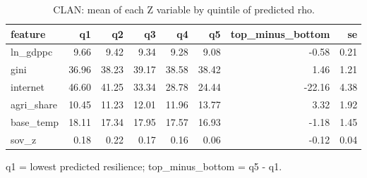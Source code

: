 \begin{table}[htbp]
\centering
\caption{CLAN: mean of each Z variable by quintile of predicted rho.}
\label{tab:agri_clan}
\begin{tabular}{lrrrrrrr}
\toprule
feature & q1 & q2 & q3 & q4 & q5 & top\_minus\_bottom & se \\
\midrule
ln\_gdppc & 9.66 & 9.42 & 9.34 & 9.28 & 9.08 & -0.58 & 0.21 \\
gini & 36.96 & 38.23 & 39.17 & 38.58 & 38.42 & 1.46 & 1.21 \\
internet & 46.60 & 41.25 & 33.34 & 28.78 & 24.44 & -22.16 & 4.38 \\
agri\_share & 10.45 & 11.23 & 12.01 & 11.96 & 13.77 & 3.32 & 1.92 \\
base\_temp & 18.11 & 17.34 & 17.95 & 17.57 & 16.93 & -1.18 & 1.45 \\
sov\_z & 0.18 & 0.22 & 0.17 & 0.16 & 0.06 & -0.12 & 0.04 \\
\bottomrule
\end{tabular}
\par\smallskip\footnotesize q1 = lowest predicted resilience; top\_minus\_bottom = q5 - q1.
\end{table}
